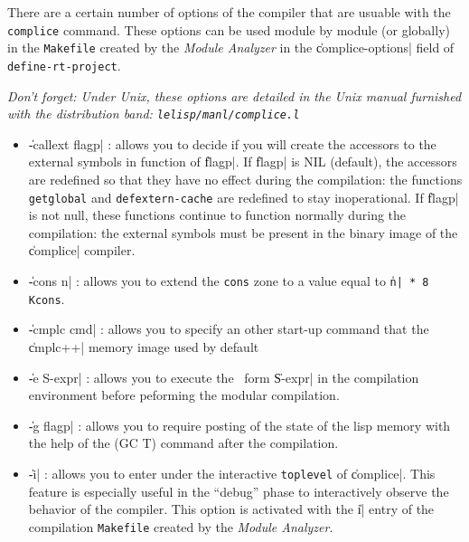 There are a certain number of options of the compiler that are usuable with the {\tt complice} command.  These options can be used module by module (or globally) in the {\tt Makefile} created by the {\em Module Analyzer} in the \|complice-options| field of {\tt define-rt-project}.

{\it Don't forget: Under Unix, these options are detailed in the Unix manual furnished with the distribution band:  {\tt lelisp/manl/complice.l}}

\begin{itemize}
\item {\Large \|-callext flagp|} : 
allows you to decide if you will create the accessors to the external symbols in function of \|flagp|.
If \|flagp| is NIL (default), the accessors are redefined so that they have no effect during the compilation:  the functions {\tt getglobal} and {\tt defextern-cache} are redefined to stay inoperational.  If \|flagp| is not null, these functions continue to function normally during the compilation:  the external symbols must be present in the binary image of the \|complice| compiler. 

\item {\Large \|-cons n|} : allows you to extend the {\tt cons} zone 
to a value equal to {\tt \|n| * 8 Kcons}.

\item {\Large \|-cmplc cmd|} :  allows you to specify an other start-up command that the \|cmplc++| memory image used by default 

\item {\Large \|-e S-expr|} : allows you to execute the \LeLisp\ form \|S-expr| in the compilation environment before peforming the modular compilation. 

\item {\Large \|-g flagp|} : allows you to require posting of the state of the lisp memory with the help of the (GC T) command after the compilation.

\item {\Large \|-i|} : allows you to enter under the interactive {\tt toplevel} of \|complice|.  This feature is especially useful in the ``debug'' phase to interactively observe the behavior of the compiler.  This option is activated with the \|i| entry of the compilation {\tt Makefile} created by the {\em Module Analyzer}.  


\end{itemize}
